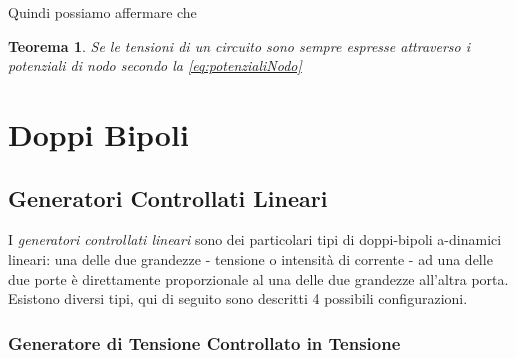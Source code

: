 \documentclass[a4paper]{report}
\newtheorem{definizione}{Teorema}
\begin{document}
Quindi possiamo affermare che

\begin{definizione}
  Se le tensioni di un circuito sono sempre espresse attraverso i
  potenziali di nodo secondo la \ref{eq:potenzialiNodo}
\end{definizione}
\chapter{Doppi Bipoli}
\section{Generatori Controllati Lineari}
I \emph{generatori controllati lineari} sono dei particolari tipi di
doppi-bipoli a-dinamici lineari: una delle due grandezze - tensione o
intensit\`a di corrente - ad una delle due porte \`e direttamente
proporzionale al una delle due grandezze all'altra porta. Esistono
diversi tipi, qui di seguito sono descritti 4 possibili
configurazioni.

\subsection{Generatore di Tensione Controllato in Tensione}
\end{document}
